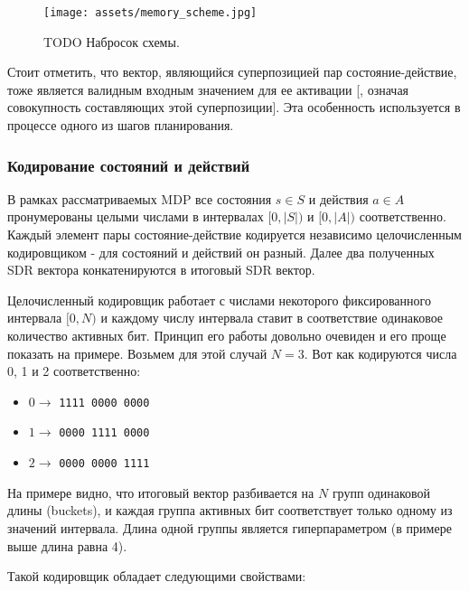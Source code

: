 \documentclass[a4paper]{article}
\begin{document}
\begin{figure}
  \texttt{[image: assets/memory\_scheme.jpg]}
  \caption{TODO Набросок схемы.}
\end{figure}

Стоит отметить, что вектор, являющийся суперпозицией пар состояние-действие, тоже является валидным входным значением для ее активации [, означая совокупность составляющих этой суперпозиции]. Эта особенность используется в процессе одного из шагов планирования.

\subsubsection{Кодирование состояний и действий}

В рамках рассматриваемых MDP все состояния $s \in S$ и действия $a \in A$ пронумерованы целыми числами в интервалах $[0, |S|)$ и $[0, |A|)$ соответственно. Каждый элемент пары состояние-действие кодируется независимо целочисленным кодировщиком - для состояний и действий он разный. Далее два полученных SDR вектора конкатенируются в итоговый SDR вектор.

Целочисленный кодировщик работает с числами некоторого фиксированного интервала $[0, N)$ и каждому числу интервала ставит в соответствие одинаковое количество активных бит. Принцип его работы довольно очевиден и его проще показать на примере. Возьмем для этой случай $N = 3$. Вот как кодируются числа 0, 1 и 2 соответственно:

\begin{itemize}
  \item $0 \rightarrow$ \verb|1111 0000 0000|
  \item $1 \rightarrow$ \verb|0000 1111 0000|
  \item $2 \rightarrow$ \verb|0000 0000 1111|
\end{itemize}

На примере видно, что итоговый вектор разбивается на $N$ групп одинаковой длины (buckets), и каждая группа активных бит соответствует только одному из значений интервала. Длина одной группы является гиперпараметром (в примере выше длина равна 4).

Такой кодировщик обладает следующими свойствами:
\end{document}
